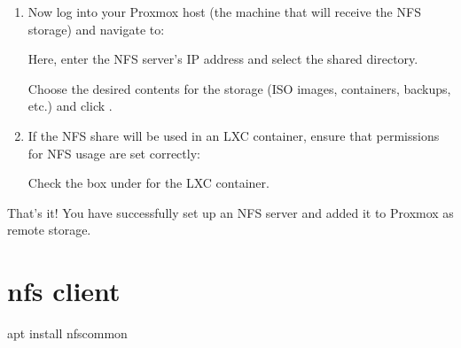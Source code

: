 \documentclass[letterpaper,10pt,english]{sphinxmanual}
\begin{document}
\begin{enumerate}
\sphinxAtStartPar
Save the file and restart the NFS server:

\begin{sphinxVerbatim}[commandchars=\\\{\}]
sudoexportfs\PYGZhy{}ra
sudosystemctlrestartnfs\PYGZhy{}kernel\PYGZhy{}server
\end{sphinxVerbatim}

\item {} 
\sphinxAtStartPar
{}

\sphinxAtStartPar
Now log into your Proxmox host (the machine that will receive the NFS storage) and navigate to:

\sphinxAtStartPar
{}

\noindent{}

\sphinxAtStartPar
Here, enter the NFS server’s IP address and select the shared directory.

\noindent{}

\sphinxAtStartPar
Choose the desired contents for the storage (ISO images, containers, backups, etc.) and click .

\item {} 
\sphinxAtStartPar
{}

\sphinxAtStartPar
If the NFS share will be used in an LXC container, ensure that permissions for NFS usage are set correctly:

\noindent{}

\sphinxAtStartPar
Check the  box under  for the LXC container.

\end{enumerate}

\sphinxAtStartPar
That’s it! You have successfully set up an NFS server and added it to Proxmox as remote storage.

\sphinxstepscope


\chapter{nfs client}
\label{\detokenize{nfs_client:nfs-client}}\label{\detokenize{nfs_client::doc}}
\sphinxAtStartPar
apt install nfs\sphinxhyphen{}common
\end{document}
